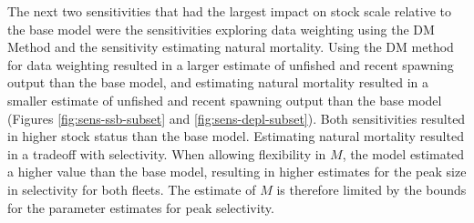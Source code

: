 \documentclass[11pt,
  english,
  a4paper,
]{article}
\begin{document}
The next two sensitivities that had the largest impact on stock scale relative to the base model were the sensitivities exploring data weighting using the DM Method and the sensitivity estimating natural mortality. Using the DM method for data weighting resulted in a larger estimate of unfished and recent spawning output than the base model, and estimating natural mortality resulted in a smaller estimate of unfished and recent spawning output than the base model (Figures \ref{fig:sens-ssb-subset} and \ref{fig:sens-depl-subset}). Both sensitivities resulted in higher stock status than the base model. Estimating natural mortality resulted in a tradeoff with selectivity. When allowing flexibility in {\(M\)\leavevmode\tagmcend\tagstructend}, the model estimated a higher value than the base model, resulting in higher estimates for the peak size in selectivity for both fleets. The estimate of {\(M\)\leavevmode\tagmcend\tagstructend} is therefore limited by the bounds for the parameter estimates for peak selectivity.

\leavevmode\tagmcend\tagstructend\par

\end{document}
